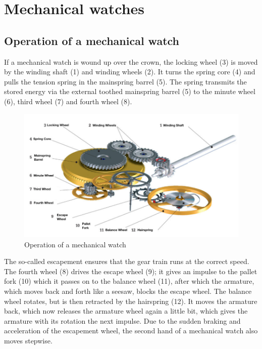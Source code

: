 \documentclass[12pt, a4paper]{report}
\begin{document}
    
    \section{Mechanical watches}  
    \subsection{Operation of a mechanical watch}  
    If a mechanical watch is wound up over the crown, the locking wheel (3) is moved by the winding shaft (1) and winding wheels (2). It turns the spring core (4) and pulls the tension spring in the mainspring barrel (5). The spring transmits the stored energy via the external toothed mainspring barrel (5) to the minute wheel (6), third wheel (7) and fourth wheel (8). 
    \newline
    \noindent
    \begin{figure}[H]
    \centering
    \includegraphics[scale=0.45]{Images/Funktionsweise-Uhrwerk.jpg}
    
    \caption{Operation of a mechanical watch \cite{Uhrwerk}}
    \end{figure}
The so-called escapement ensures that the gear train runs at the correct speed. The fourth wheel (8) drives the escape wheel (9); it gives an impulse to the pallet fork (10) which it passes on to the balance wheel (11), after which the armature, which moves back and forth like a seesaw, blocks the escape wheel. The balance wheel rotates, but is then retracted by the hairspring (12). It moves the armature back, which now releases the armature wheel again a little bit, which gives the armature with its rotation the next impulse. Due to the sudden braking and acceleration of the escapement wheel, the second hand of a mechanical watch also moves stepwise. \cite{Uhrwerk}
    \newline
\end{document}
